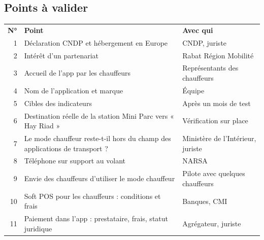 \documentclass[11pt,a4paper]{article}
\newcommand{\hd}[1]{\textbf{\color{white}#1}}
\newcommand{\hdrow}{\rowcolor{brand}}
\begin{document}
\Needspace{7cm}
\subsection{Points à valider}
\begin{xltabular}{\textwidth}{@{}r Y l@{}}
\hdrow \hd{N°} & \hd{Point} & \hd{Avec qui} \\
1 & Déclaration CNDP et hébergement en Europe & CNDP, juriste \\
2 & Intérêt d'un partenariat & Rabat Région Mobilité \\
3 & Accueil de l'app par les chauffeurs & Représentants des chauffeurs \\
4 & Nom de l'application et marque & Équipe \\
5 & Cibles des indicateurs & Après un mois de test \\
6 & Destination réelle de la station Mini Parc vers « Hay Riad » & Vérification sur place \\
7 & Le mode chauffeur reste-t-il hors du champ des applications de transport ? & Ministère de l'Intérieur, juriste \\
8 & Téléphone sur support au volant & NARSA \\
9 & Envie des chauffeurs d'utiliser le mode chauffeur & Pilote avec quelques chauffeurs \\
10 & Soft POS pour les chauffeurs : conditions et frais & Banques, CMI \\
11 & Paiement dans l'app : prestataire, frais, statut juridique & Agrégateur, juriste \\
\end{xltabular}

\Needspace{6cm}
\end{document}

